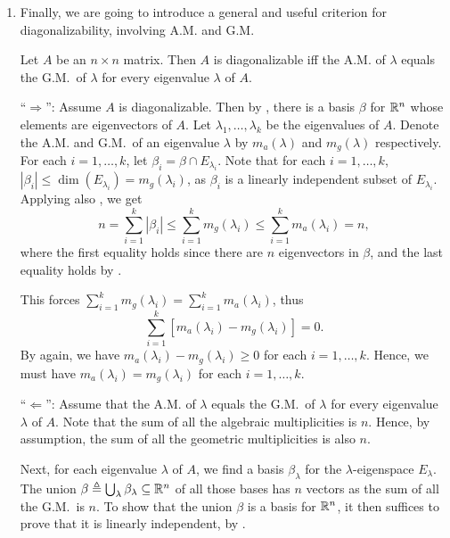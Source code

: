 \begin{enumerate}
\item Finally, we are going to introduce a general and useful criterion for
diagonalizability, involving A.M. and G.M.

\begin{theorem}
\label{thm:am-gm-diag-crit}
Let \(A\) be an \(n\times n\) matrix. Then \(A\) is diagonalizable iff the A.M.
of \(\lambda\) equals the G.M.\ of \(\lambda\) for every eigenvalue \(\lambda\)
of \(A\).
\end{theorem}
\begin{pf}
``\(\Rightarrow\)'': Assume \(A\) is diagonalizable. Then by
, there is a basis \(\beta\) for \(\mathbb{R}^n\) whose elements
are eigenvectors of \(A\). Let \(\lambda_1,\dotsc,\lambda_k\) be the
eigenvalues of \(A\). Denote the A.M. and G.M.\ of an eigenvalue \(\lambda\) by
\(m_{a}(\lambda)\) and \(m_{g}(\lambda)\) respectively. For each
\(i=1,\dotsc,k\), let \(\beta_i=\beta\cap E_{\lambda_i}\). Note that for each
\(i=1,\dotsc,k\), \(|\beta_i|\le\dim(E_{\lambda_i})=m_{g}(\lambda_i)\), as
\(\beta_i\) is a linearly independent subset of \(E_{\lambda_i}\). Applying
also , we get
\[
n=\sum_{i=1}^{k}|\beta_i|\le\sum_{i=1}^{k}m_{g}(\lambda_i)\le\sum_{i=1}^{k}m_a(\lambda_i)=n,
\]
where the first equality holds since there are \(n\) eigenvectors in \(\beta\),
and the last equality holds by .

This forces \(\sum_{i=1}^{k}m_{g}(\lambda_i)=\sum_{i=1}^{k}m_{a}(\lambda_i)\),
thus
\[
\sum_{i=1}^{k}[m_{a}(\lambda_i)-m_{g}(\lambda_i)]=0.
\]
By  again, we have \(m_a(\lambda_i)-m_g(\lambda_i)\ge 0\)
for each \(i=1,\dotsc,k\). Hence, we must have
\(m_a(\lambda_i)=m_{g}(\lambda_i)\) for each \(i=1,\dotsc,k\).

``\(\Leftarrow\)'': Assume that the A.M. of \(\lambda\) equals the G.M.\ of
\(\lambda\) for every eigenvalue \(\lambda\) of \(A\). Note that the sum of all
the algebraic multiplicities is \(n\). Hence, by assumption, the sum of all the
geometric multiplicities is also \(n\).

Next, for each eigenvalue \(\lambda\) of \(A\), we find a basis
\(\beta_{\lambda}\) for the \(\lambda\)-eigenspace \(E_{\lambda}\). The union
\(\beta\triangleq\bigcup_{\lambda}\beta_{\lambda}\subseteq \mathbb{R}^n\) of all those
bases has \(n\) vectors as the sum of all the G.M.\ is \(n\). To show that the
union \(\beta\) is a basis for \(\mathbb{R}^n\), it then suffices to prove that it is
linearly independent, by .


\end{pf}
\end{enumerate}
